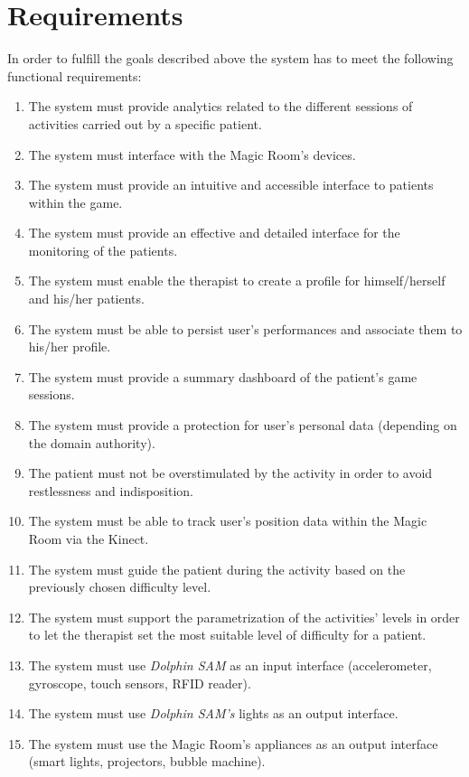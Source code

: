 \section{Requirements}
In order to fulfill the goals described above the system has to meet the following functional requirements:
\begin{enumerate}
	\item The system must provide analytics related to the different sessions of activities carried out by a specific patient.
	\item The system must interface with the Magic Room’s devices.
	\item The system must provide an intuitive and accessible interface to patients within the game.
	\item The system must provide an effective and detailed interface for the monitoring of the patients.
	\item The system must enable the therapist to create a profile for himself/herself and his/her patients.
	\item The system must be able to persist user’s performances and associate them to his/her profile.
	\item The system must provide a summary dashboard of the patient’s game sessions.
	\item The system must provide a protection for user’s personal data (depending on the domain authority).
	\item The patient must not be overstimulated by the activity in order to avoid restlessness and indisposition.
	\item The system must be able to track user’s position data within the Magic Room via the Kinect.
	\item The system must guide the patient during the activity based on the previously chosen difficulty level.
	\item The system must support the parametrization of the activities' levels in order to let the therapist set the most suitable level of difficulty for a patient.
	\item The system must use \textit{Dolphin SAM} as an input interface (accelerometer, gyroscope, touch sensors, RFID reader).
	\item The system must use \textit{Dolphin SAM's} lights as an output interface.
	\item The system must use the Magic Room's appliances as an output interface (smart lights, projectors, bubble machine).
\end{enumerate}
